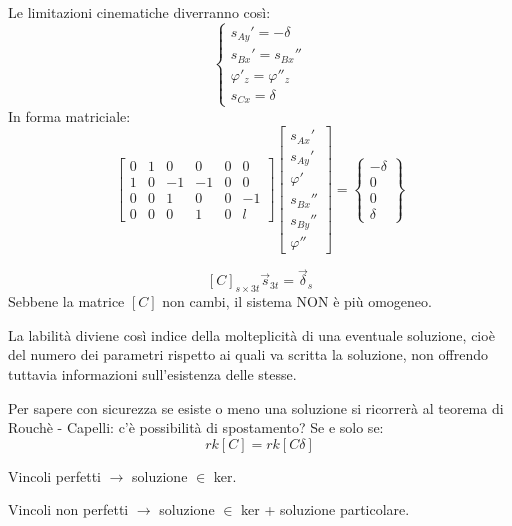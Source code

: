 \documentclass{article}
\begin{document}
\begin{adjustwidth}{2in}{}
Le limitazioni cinematiche diverranno così: 
\[
\begin{cases}
	s_{Ay}'= -\delta \\
	s_{Bx}' = s_{Bx}'' \\
	\varphi'_z = \varphi''_z \\
	s_{Cx} = \delta
\end{cases}
\]		
In forma matriciale: 
\[
\left[\begin{array}{cccccc}
	0 & 1 & 0 & 0 & 0 & 0 \\
	1 & 0 & -1 & -1 & 0 & 0 \\
	0 & 0 & 1 & 0 & 0 & -1 \\
	0 & 0 & 0 & 1 & 0 & l
\end{array} \right] \left[ \begin{array}{c}
	s_{Ax}' \\
	s_{Ay}' \\
	\varphi' \\
	s_{Bx}'' \\
	s_{By}'' \\
	\varphi''
\end{array}\right] = \left\lbrace \begin{array}{c}
-\delta \\
0 \\
0 \\
\delta
\end{array} \right\rbrace 
\]	

\[
[C]_{s\times 3t}\vec{s}_{3t} =\vec{\delta}_s\]		
Sebbene la matrice $[C]$ non cambi, il sistema NON è più omogeneo. 

La labilità diviene così indice della molteplicità  di una eventuale soluzione, cioè del numero dei parametri rispetto ai quali va scritta la soluzione, non offrendo tuttavia informazioni sull'esistenza delle stesse. 

Per sapere con sicurezza se esiste o meno una soluzione si ricorrerà al teorema di Rouchè - Capelli: c'è possibilità di spostamento? Se e solo se:
\[rk[C] = rk[C\delta]\] 

Vincoli perfetti $\rightarrow$ soluzione $\in$ ker. 

Vincoli non perfetti $\rightarrow$ soluzione $\in$ ker + soluzione particolare. \newline 


\end{adjustwidth}
\end{document}
